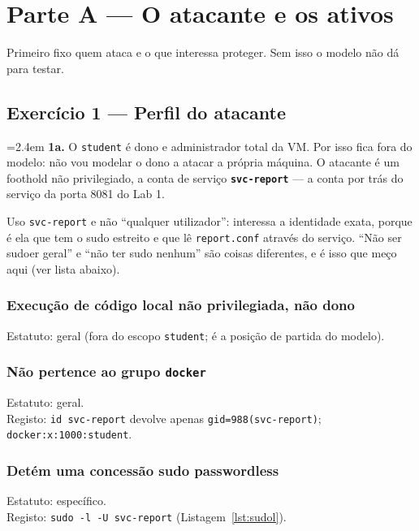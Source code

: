 \documentclass[a4paper,11pt]{article}
\newenvironment{answer}[1]{%
  \par\addvspace{7pt}\noindent
  \hangindent=2.4em\hangafter=1
  {\color{sscnblue}\bfseries #1\hspace{0.55em}}\ignorespaces}
  {\par\addvspace{5pt}}
\newcommand{\cmd}[1]{\textcolor{sscnblue}{\texttt{#1}}}
\begin{document}
\section{Parte A --- O atacante e os ativos}
Primeiro fixo quem ataca e o que interessa proteger. Sem isso o modelo n\~ao d\'a
para testar.

\subsection{Exerc\'{i}cio 1 --- Perfil do atacante}

\begin{answer}{1a.}
O \cmd{student} \'e dono e administrador total da VM. Por isso fica fora do modelo:
n\~ao vou modelar o dono a atacar a pr\'opria m\'aquina. O atacante \'e um foothold
n\~ao privilegiado, a conta de servi\c{c}o \textbf{\cmd{svc-report}} --- a conta por
tr\'as do servi\c{c}o da porta 8081 do Lab 1.

Uso \cmd{svc-report} e n\~ao ``qualquer utilizador'': interessa a identidade exata,
porque \'e ela que tem o sudo estreito e que l\^e \cmd{report.conf} atrav\'es do
servi\c{c}o. ``N\~ao ser sudoer geral'' e ``n\~ao ter sudo nenhum'' s\~ao coisas
diferentes, e \'e isso que me\c{c}o aqui (ver lista abaixo).

\subsubsection*{Execu\c{c}\~{a}o de c\'{o}digo local n\~{a}o privilegiada, n\~{a}o dono}
Estatuto: geral (fora do escopo \cmd{student}; \'e a posi\c{c}\~{a}o de partida do modelo).

\subsubsection*{N\~{a}o pertence ao grupo \cmd{docker}}
Estatuto: geral.\\
Registo: \cmd{id svc-report} devolve apenas \cmd{gid=988(svc-report)}; \cmd{docker:x:1000:student}.

\subsubsection*{Det\'{e}m uma concess\~{a}o sudo passwordless}
Estatuto: espec\'{i}fico.\\
Registo: \cmd{sudo -l -U svc-report} (Listagem~\ref{lst:sudol}).


\end{answer}
\end{document}
